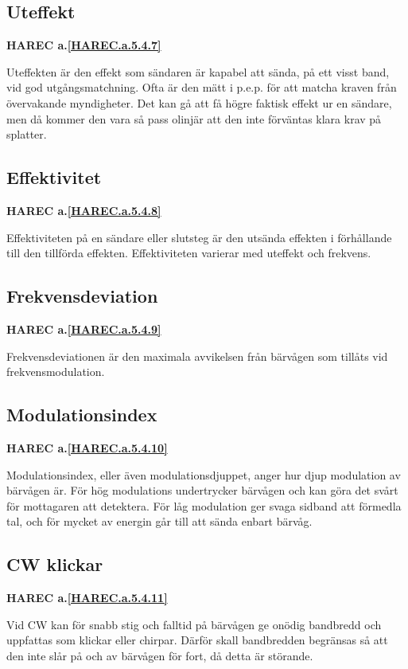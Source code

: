 \subsection{Uteffekt}
\textbf{HAREC
  a.\ref{HAREC.a.5.4.7}\label{myHAREC.a.5.4.7}
}

Uteffekten är den effekt som sändaren är kapabel att sända, på ett visst band,
vid god utgångsmatchning. Ofta är den mätt i p.e.p. för att matcha kraven från
övervakande myndigheter. Det kan gå att få högre faktisk effekt ur en sändare,
men då kommer den vara så pass olinjär att den inte förväntas klara krav på
splatter.

\subsection{Effektivitet}
\textbf{HAREC
  a.\ref{HAREC.a.5.4.8}\label{myHAREC.a.5.4.8}
}

Effektiviteten på en sändare eller slutsteg är den utsända effekten i
förhållande till den tillförda effekten. Effektiviteten varierar med uteffekt
och frekvens.

\subsection{Frekvensdeviation}
\textbf{HAREC
  a.\ref{HAREC.a.5.4.9}\label{myHAREC.a.5.4.9}
}

Frekvensdeviationen är den maximala avvikelsen från bärvågen som tillåts vid
frekvensmodulation.

\subsection{Modulationsindex}
\textbf{HAREC
  a.\ref{HAREC.a.5.4.10}\label{myHAREC.a.5.4.10}
}

Modulationsindex, eller även modulationsdjuppet, anger hur djup modulation av
bärvågen är. För hög modulations undertrycker bärvågen och kan göra det svårt
för mottagaren att detektera. För låg modulation ger svaga sidband att förmedla
tal, och för mycket av energin går till att sända enbart bärvåg.

\subsection{CW klickar}
\textbf{HAREC
  a.\ref{HAREC.a.5.4.11}\label{myHAREC.a.5.4.11}
}

Vid CW kan för snabb stig och falltid på bärvågen ge onödig bandbredd och
uppfattas som klickar eller chirpar. Därför skall bandbredden begränsas så att
den inte slår på och av bärvågen för fort, då detta är störande.

